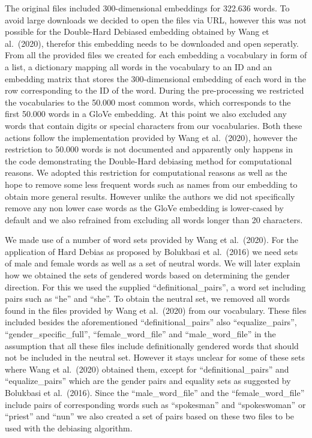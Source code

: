 \documentclass[
  english,
  man,floatsintext]{apa6}
\begin{document}
The original files included 300-dimensional embeddings for 322.636 words. To avoid large downloads we decided to open the files via URL, however this was not possible for the Double-Hard Debiased embedding obtained by Wang et al.~(2020), therefor this embedding needs to be downloaded and open seperatly. From all the provided files we created for each embedding a vocabulary in form of a list, a dictionary mapping all words in the vocabulary to an ID and an embedding matrix that stores the 300-dimensional embedding of each word in the row corresponding to the ID of the word. During the pre-processing we restricted the vocabularies to the 50.000 most common words, which corresponds to the first 50.000 words in a GloVe embedding. At this point we also excluded any words that contain digits or special characters from our vocabularies. Both these actions follow the implementation provided by Wang et al.~(2020), however the restriction to 50.000 words is not documented and apparently only happens in the code demonstrating the Double-Hard debiasing method for computational reasons. We adopted this restriction for computational reasons as well as the hope to remove some less frequent words such as names from our embedding to obtain more general results. However unlike the authors we did not specifically remove any non lower case words as the GloVe embedding is lower-cased by default and we also refrained from excluding all words longer than 20 characters.

We made use of a number of word sets provided by Wang et al.~(2020). For the application of Hard Debias as proposed by Bolukbasi et al.~(2016) we need sets of male and female words as well as a set of neutral words. We will later explain how we obtained the sets of gendered words based on determining the gender direction. For this we used the supplied \enquote{definitional\_pairs}, a word set including pairs such as \enquote{he} and \enquote{she}. To obtain the neutral set, we removed all words found in the files provided by Wang et al.~(2020) from our vocabulary. These files included besides the aforementioned \enquote{definitional\_pairs} also \enquote{equalize\_pairs}, \enquote{gender\_specific\_full}, \enquote{female\_word\_file} and \enquote{male\_word\_file} in the assumption that all these files include definitionally gendered words that should not be included in the neutral set. However it stays unclear for some of these sets where Wang et al.~(2020) obtained them, except for \enquote{definitional\_pairs} and \enquote{equalize\_pairs} which are the gender pairs and equality sets as suggested by Bolukbasi et al.~(2016). Since the \enquote{male\_word\_file} and the \enquote{female\_word\_file} include pairs of corresponding words such as \enquote{spokesman} and \enquote{spokeswoman} or \enquote{priest} and \enquote{nun} we also created a set of pairs based on these two files to be used with the debiasing algorithm.
\end{document}
